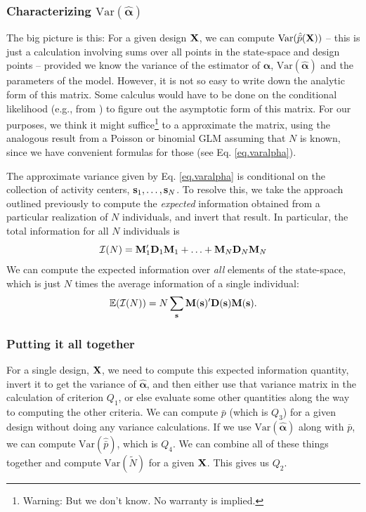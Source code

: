 \subsubsection{Characterizing $\mbox{Var}( \hat{\bm \alpha})$ }

The big picture is this: For a given design ${\bf X}$, we can compute
$\mbox{Var}(\hat{\bar{p}}({\bf X}))$ -- this is just a calculation
involving sums over all points in the state-space and design points
-- provided we know the variance of the estimator of ${\bm \alpha}$,
$\mbox{Var}(\hat{\bm \alpha})$ and the parameters of the model.
However, it is not so easy to write down the analytic form of this
matrix.  Some calculus would have to be done on the conditional
likelihood (e.g., from \citet{borchers_efford:2008}) to figure out the
asymptotic form of this matrix.  For our purposes, we think it might
suffice\footnote{Warning: But we don't know. No warranty is implied.}
to a approximate the matrix, using the analogous result from a Poisson
or binomial GLM assuming that $N$ is known, since we have convenient
formulas for those (see Eq. \ref{eq.varalpha}).

The approximate variance given by Eq. \ref{eq.varalpha}
is conditional on the collection of activity centers, ${\bf
  s}_{1},\ldots,{\bf s}_{N}$. To resolve this, we take the approach
outlined previously to compute the {\it expected} information obtained
from a particular realization of $N$ individuals, and invert that
result. In particular, the total information for all $N$ individuals
is
\[
{\cal I}(N) =  {\bf M}_{1}' {\bf D}_{1} {\bf M}_{1} + \ldots +
{\bf M}_{N}{\bf D}_{N} {\bf M}_{N}
\]
We can compute
the expected information over {\it all} elements of the state-space,
which is just $N$ times the average information of a single
individual:
\[
\mathbb{E}( {\cal I}(N) ) = N  \sum_{{\bf s}}  {\bf M}({\bf s})'{\bf
  D}({\bf s}) {\bf M}({\bf s}).
\]


\subsubsection{Putting it all together}

For a single design, ${\bf X}$, we need
to compute this expected information quantity, invert it to get the
variance of $\hat{\bm \alpha}$, and then either use that variance
matrix in the calculation of criterion $Q_{1}$, or else evaluate some
other quantities along the way to computing the other criteria. 
We can compute $\bar{p}$ (which is $Q_{3}$) for a given design without
doing any variance calculations. 
If we use $\mbox{Var}(\hat{\bm \alpha})$ along with $\bar{p}$, we can
compute $\mbox{Var}(\hat{\bar{p}})$, which is $Q_{4}$. 
We can combine all of these things together and compute
$\mbox{Var}(\tilde{N})$ for a given ${\bf X}$. This gives us $Q_2$. 



